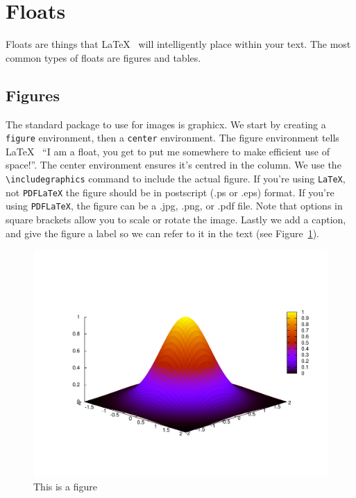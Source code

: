 \documentclass[twocolumn,10 pt,showpacs,preprintnumbers,amsmath,amssymb]{revtex4-1}
\begin{document}
\section*{Floats}

Floats are things that \LaTeX~ will intelligently place within your
text. The most common types of floats are figures and tables.

\subsection{Figures}

The standard package to use for images is graphicx. We start by creating
a \texttt{figure} environment, then a \texttt{center} environment. The
figure environment tells \LaTeX~ ``I am a float, you get to put me
somewhere to make efficient use of space!''. The center environment
ensures it's centred in the column. We use the \verb_\includegraphics_
command to include the actual figure. If you're using \texttt{LaTeX},
not \texttt{PDFLaTeX} the figure should be in postscript (.ps or .eps)
format. If you're using \texttt{PDFLaTeX}, the figure can be a .jpg,
.png, or .pdf file. Note that options in square brackets allow you to
scale or rotate the image. Lastly we add a caption, and give the figure
a label so we can refer to it in the text (see Figure~\ref{fig:exp}).

\begin{figure}
  \centering
  \includegraphics[scale=0.25,angle=-90]{figure.pdf}
  \caption{This is a figure}
  \label{fig:exp}
\end{figure}
\end{document}
